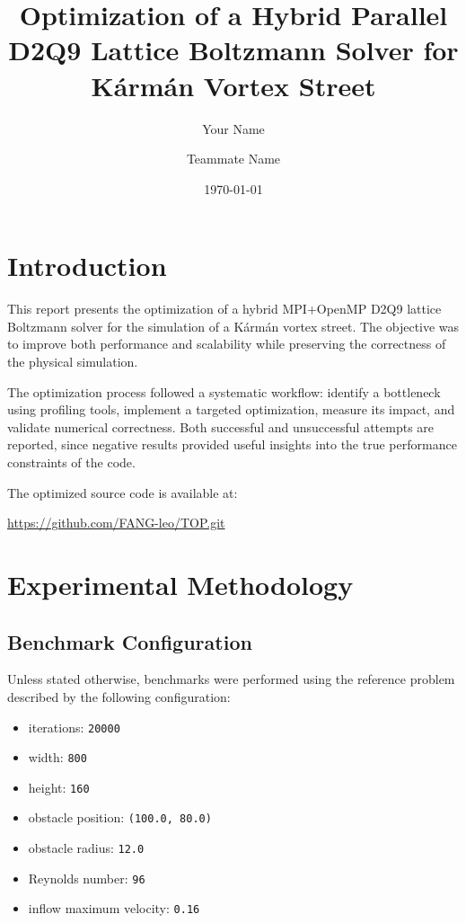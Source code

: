 \documentclass[11pt,a4paper]{article}
\title{Optimization of a Hybrid Parallel D2Q9 Lattice Boltzmann Solver for K\'arm\'an Vortex Street}
\author{Your Name \and Teammate Name}
\date{\today}
\begin{document}
\maketitle
\tableofcontents
\newpage

\section{Introduction}

This report presents the optimization of a hybrid MPI+OpenMP D2Q9 lattice Boltzmann solver for the simulation of a K\'arm\'an vortex street. The objective was to improve both performance and scalability while preserving the correctness of the physical simulation.

The optimization process followed a systematic workflow: identify a bottleneck using profiling tools, implement a targeted optimization, measure its impact, and validate numerical correctness. Both successful and unsuccessful attempts are reported, since negative results provided useful insights into the true performance constraints of the code.

The optimized source code is available at:
\begin{center}
\url{https://github.com/FANG-leo/TOP.git}
\end{center}

\section{Experimental Methodology}

\subsection{Benchmark Configuration}

Unless stated otherwise, benchmarks were performed using the reference problem described by the following configuration:
\begin{itemize}[leftmargin=1.5em]
  \item iterations: \texttt{20000}
  \item width: \texttt{800}
  \item height: \texttt{160}
  \item obstacle position: \texttt{(100.0, 80.0)}
  \item obstacle radius: \texttt{12.0}
  \item Reynolds number: \texttt{96}
  \item inflow maximum velocity: \texttt{0.16}
\end{itemize}
\end{document}
